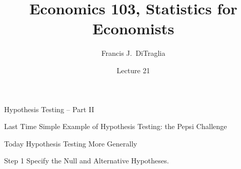\documentclass[handout]{beamer}
\title[Econ 103]{Economics 103, Statistics for Economists}
\author[F. DiTraglia]{Francis J.\ DiTraglia}
\institute{University of Pennsylvania}
\date{Lecture 21}
\begin{document}
 





\begin{frame}[plain]
	\titlepage 
	

\end{frame} 



\begin{frame}
\begin{center}
	\huge Hypothesis Testing -- Part II
\end{center}
\end{frame}



\begin{frame}
\begin{block}{Last Time}
Simple Example of Hypothesis Testing: the Pepsi Challenge
\end{block}

\begin{block}{Today}
Hypothesis Testing More Generally
\end{block}

\end{frame}
\begin{frame}

\begin{alertblock}{Step 1}
Specify the Null and Alternative Hypotheses.
\end{alertblock}

\end{frame}
\end{document}
